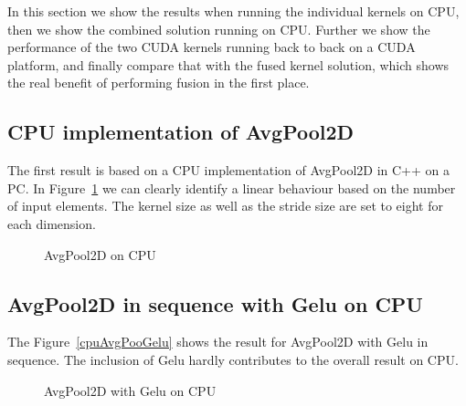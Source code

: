 \documentclass[letterpaper]{article}
\begin{document}
In this section we show the results when running the individual kernels on CPU, then we show the combined solution running on CPU. Further we show the performance of the two CUDA kernels running back to back on a CUDA platform, and finally compare that with the fused kernel solution, which shows the real benefit of performing fusion in the first place. 

\subsection{CPU implementation of AvgPool2D}

The first result is based on a CPU implementation of AvgPool2D in C++ on a PC. In Figure~\ref{cpuAvgPool} we can clearly identify a linear behaviour based on the number of input elements. The kernel size as well as the stride size are set to eight for each dimension.  

\begin{figure}
\caption{AvgPool2D on CPU}
\label{cpuAvgPool}
\end{figure}

\subsection{AvgPool2D in sequence with Gelu on CPU}

The Figure~\ref{cpuAvgPooGelu} shows the result for AvgPool2D with Gelu in sequence. The inclusion of Gelu hardly contributes to the overall result on CPU. 

\begin{figure}
\caption{AvgPool2D with Gelu on CPU}
\label{cpuAvgPoolGelu}
\end{figure}
\end{document}
